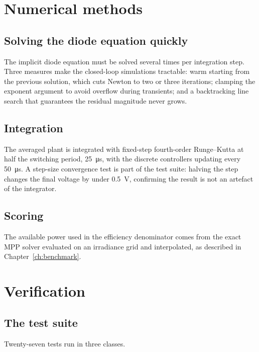 \section{Numerical methods}

\subsection{Solving the diode equation quickly}

The implicit diode equation must be solved several times per integration step.
Three measures make the closed-loop simulations tractable: warm starting from
the previous solution, which cuts Newton to two or three iterations; clamping
the exponent argument to avoid overflow during transients; and a backtracking
line search that guarantees the residual magnitude never grows.

\subsection{Integration}

The averaged plant is integrated with fixed-step fourth-order Runge--Kutta at
half the switching period, \SI{25}{\micro\second}, with the discrete controllers
updating every \SI{50}{\micro\second}. A step-size convergence test is part of
the test suite: halving the step changes the final voltage by under
\SI{0.5}{\volt}, confirming the result is not an artefact of the integrator.

\subsection{Scoring}

The available power used in the efficiency denominator comes from the exact MPP
solver evaluated on an irradiance grid and interpolated, as described in
Chapter~\ref{ch:benchmark}.

\section{Verification}

\subsection{The test suite}

Twenty-seven tests run in three classes.

